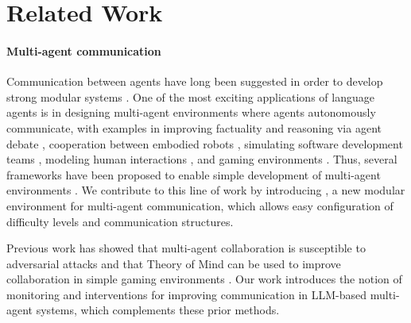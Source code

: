 \section{Related Work}
\label{sec:rw}

\paragraph{Multi-agent communication} 
Communication between agents have long been suggested in order to develop strong modular systems \cite{KRAUS199779, 8352646, sukhbaatar2016learningmultiagentcommunicationbackpropagation, foerster2016learningcommunicatedeepmultiagent, 10.1007/978-3-319-75477-2_2, lazaridou2020emergentmultiagentcommunicationdeep, lowe2020multiagentactorcriticmixedcooperativecompetitive}. 
One of the most exciting applications of language agents is in designing multi-agent environments where agents autonomously communicate, with examples in improving factuality and reasoning via agent debate \cite{du2023improvingfactualityreasoninglanguage, liang-etal-2024-encouraging}, cooperation between embodied robots \cite{mandi2023rocodialecticmultirobotcollaboration, chen2024scalablemultirobotcollaborationlarge}, simulating software development teams \cite{li2023camel, hong2024metagpt, qian-etal-2024-chatdev, liu2024a}, modeling human interactions \cite{10.1145/3526113.3545616, 10.1145/3586183.3606763}, and gaming environments \cite{mukobi2023welfarediplomacybenchmarkinglanguage, xu2024exploringlargelanguagemodels}.
Thus, several frameworks have been proposed to enable simple development of multi-agent environments \cite{li2023camel, wu2023autogenenablingnextgenllm, hong2024metagpt}.
We contribute to this line of work by introducing \ourenv{}, a new modular environment for multi-agent communication, which allows easy configuration of difficulty levels and communication structures.

Previous work has showed that multi-agent collaboration is susceptible to adversarial attacks \cite{amayuelas-etal-2024-multiagent} and that Theory of Mind can be used to improve collaboration in simple gaming environments \cite{lim2020improvingmultiagentcooperationusing}. Our work introduces the notion of monitoring and interventions for improving communication in LLM-based multi-agent systems, which complements these prior methods.

